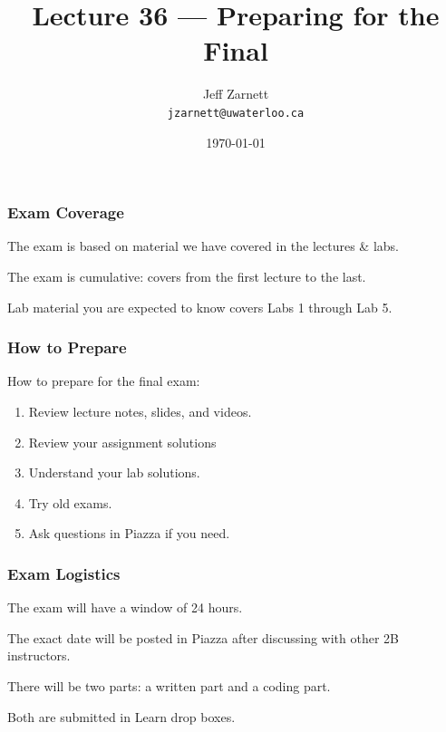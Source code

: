 

\title{Lecture 36 --- Preparing for the Final }

\author{Jeff Zarnett \\ \small \texttt{jzarnett@uwaterloo.ca}}
\date{\today}




\begin{frame}
  \titlepage

\end{frame}

\begin{frame}
\frametitle{Exam Coverage}

The exam is based on material we have covered in the lectures \& labs.

The exam is cumulative: covers from the first lecture to the last.

Lab material you are expected to know covers Labs 1 through Lab 5.

\end{frame}

\begin{frame}
\frametitle{How to Prepare}

How to prepare for the final exam:

\begin{enumerate}
	\item Review lecture notes, slides, and videos.
	\item Review your assignment solutions
	\item Understand your lab solutions.
	\item Try old exams.
	\item Ask questions in Piazza if you need.
\end{enumerate}

\end{frame}


\begin{frame}
\frametitle{Exam Logistics}

The exam will have a window of 24 hours.

The exact date will be posted in Piazza after discussing with other 2B instructors.

There will be two parts: a written part and a coding part.

Both are submitted in Learn drop boxes.

\end{frame}


